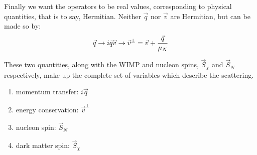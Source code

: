 \par
Finally we want the operators to be real values, corresponding to physical quantities, that is to say, Hermitian.
Neither $\vec{q}$ nor $\vec{v}$ are Hermitian, but can be made so by:
\begin{equation}
    \vec{q} \rightarrow i\vec{q} \\
    \vec{v} \rightarrow \vec{v}^{\bot} = \vec{v} + \frac{\vec{q}}{\mu_N}
\end{equation}


\par
These two quantities, along with the WIMP and nucleon spins, $\vec{S}_\chi$ and $\vec{S}_N$ respectively, make up the complete set of variables which describe the scattering. 
\begin{enumerate}
    \item momentum transfer: $i\Vec{q}$
    \item energy conservation: $\Vec{v}^{\bot}$
    \item nucleon spin: $\Vec{S}_{N}$
    \item dark matter spin: $\Vec{S}_{\chi}$
\end{enumerate}

